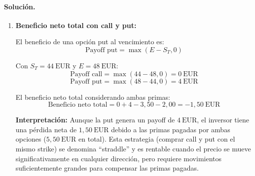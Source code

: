 \documentclass[12pt,a4paper]{article}
\newcommand{\EUR}[1]{\ensuremath{#1~\text{EUR}}}
\newenvironment{solucion}{\paragraph{Solución.}}{}
\begin{document}
\begin{solucion}
\begin{enumerate}[label=\alph*)]
  donde \(S_T\) es el precio al vencimiento y \(E = \EUR{48}\) es el precio de ejercicio.
  
  El beneficio neto incluye la prima pagada:
  \[
  \text{Beneficio neto} = \max(S_T - E, 0) - \text{Prima}
  \]
  
  Calculamos para cada escenario:
  \begin{itemize}
    \item \textbf{(i) } \(S_T = \EUR{52}\): 
    \[
    \text{Payoff} = \max(52 - 48, 0) = \EUR{4}
    \]
    \[
    \text{Beneficio neto} = 4 - 3{,}50 = \EUR{0{,}50}
    \]
    
    \item \textbf{(ii) } \(S_T = \EUR{48}\): 
    \[
    \text{Payoff} = \max(48 - 48, 0) = \EUR{0}
    \]
    \[
    \text{Beneficio neto} = 0 - 3{,}50 = -\EUR{3{,}50}
    \]
    
    \item \textbf{(iii) } \(S_T = \EUR{44}\): 
    \[
    \text{Payoff} = \max(44 - 48, 0) = \EUR{0}
    \]
    \[
    \text{Beneficio neto} = 0 - 3{,}50 = -\EUR{3{,}50}
    \]
  \end{itemize}
  
  \textbf{Observación:} La opción call solo genera beneficios cuando el precio al vencimiento supera el precio de ejercicio más la prima (\EUR{51{,}50}). Por debajo de ese nivel, la pérdida máxima está limitada a la prima pagada.
  
  \item \textbf{Beneficio neto total con call y put:}
  
  El beneficio de una opción put al vencimiento es:
  \[
  \text{Payoff put} = \max(E - S_T, 0)
  \]
  
  Con \(S_T = \EUR{44}\) y \(E = \EUR{48}\):
  \[
  \text{Payoff call} = \max(44 - 48, 0) = \EUR{0}
  \]
  \[
  \text{Payoff put} = \max(48 - 44, 0) = \EUR{4}
  \]
  
  El beneficio neto total considerando ambas primas:
  \[
  \text{Beneficio neto total} = 0 + 4 - 3{,}50 - 2{,}00 = -\EUR{1{,}50}
  \]
  
  \textbf{Interpretación:} Aunque la put genera un payoff de \EUR{4}, el inversor tiene una pérdida neta de \EUR{1{,}50} debido a las primas pagadas por ambas opciones (\EUR{5{,}50} en total). Esta estrategia (comprar call y put con el mismo strike) se denomina ``straddle'' y es rentable cuando el precio se mueve significativamente en cualquier dirección, pero requiere movimientos suficientemente grandes para compensar las primas pagadas.
\end{enumerate}
\end{solucion}

 
\end{document}
